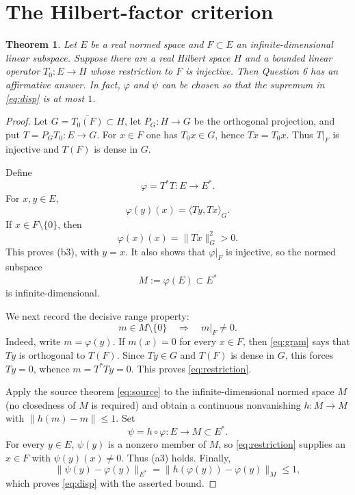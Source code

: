 \documentclass[11pt,a4paper]{article}
\newtheorem{theorem}{Theorem}
\begin{document}
\section{The Hilbert-factor criterion}

\begin{theorem}\label{thm:criterion}
Let $E$ be a real normed space and $F\subset E$ an infinite-dimensional
linear subspace.  Suppose there are a real Hilbert space $H$ and a bounded
linear operator $T_0:E\to H$ whose restriction to $F$ is injective.  Then
Question 6 has an affirmative answer.  In fact, $\varphi$ and $\psi$ can be
chosen so that the supremum in \eqref{eq:disp} is at most $1$.
\end{theorem}

\begin{proof}
Let $G=\overline{T_0(F)}\subset H$, let $P_G:H\to G$ be the orthogonal
projection, and put $T=P_GT_0:E\to G$.  For $x\in F$ one has
$T_0x\in G$, hence $Tx=T_0x$.  Thus $T|_F$ is injective and $T(F)$ is dense
in $G$.

Define
\[
 \varphi=T^*T:E\longrightarrow E^*.
\]
For $x,y\in E$,
\begin{equation}\label{eq:gram}
 \varphi(y)(x)=\langle Ty,Tx\rangle_G.
\end{equation}
If $x\in F\setminus\{0\}$, then
\[
 \varphi(x)(x)=\|Tx\|_G^2>0.
\]
This proves (b3), with $y=x$.  It also shows that $\varphi|_F$ is injective,
so the normed subspace
\[
 M:=\varphi(E)\subset E^*
\]
is infinite-dimensional.

We next record the decisive range property:
\begin{equation}\label{eq:restriction}
 m\in M\setminus\{0\}\quad\Longrightarrow\quad m|_F\ne0.
\end{equation}
Indeed, write $m=\varphi(y)$.  If $m(x)=0$ for every $x\in F$, then
\eqref{eq:gram} says that $Ty$ is orthogonal to $T(F)$.  Since $Ty\in G$ and
$T(F)$ is dense in $G$, this forces $Ty=0$, whence
$m=T^*Ty=0$.  This proves \eqref{eq:restriction}.

Apply the source theorem \eqref{eq:source} to the infinite-dimensional normed
space $M$ (no closedness of $M$ is required) and obtain a continuous
nonvanishing $h:M\to M$ with $\|h(m)-m\|\le1$.  Set
\[
 \psi=h\circ\varphi:E\longrightarrow M\subset E^*.
\]
For every $y\in E$, $\psi(y)$ is a nonzero member of $M$, so
\eqref{eq:restriction} supplies an $x\in F$ with $\psi(y)(x)\ne0$.  Thus
(a3) holds.  Finally,
\[
 \|\psi(y)-\varphi(y)\|_{E^*}
 =\|h(\varphi(y))-\varphi(y)\|_M\le1,
\]
which proves \eqref{eq:disp} with the asserted bound.
\end{proof}
\end{document}
